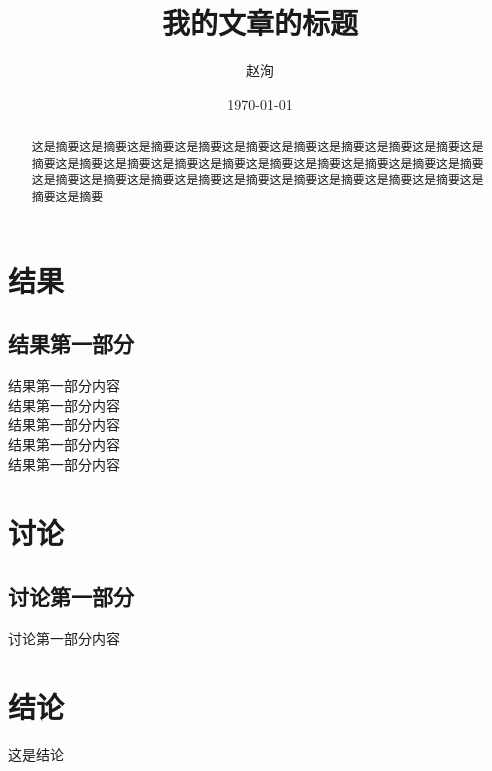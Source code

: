 \documentclass[lang=cn]{elegantpaper}
\title{我的文章的标题}
\author{赵洵}
\institute{组织机构}
\date{\today}
\begin{document}
    \maketitle

    \renewcommand{\abstractname}{摘要}
    \begin{abstract}
        这是摘要这是摘要这是摘要这是摘要这是摘要这是摘要这是摘要这是摘要这是摘要这是摘要这是摘要这是摘要这是摘要这是摘要这是摘要这是摘要这是摘要这是摘要这是摘要这是摘要这是摘要这是摘要这是摘要这是摘要这是摘要这是摘要这是摘要这是摘要这是摘要这是摘要
    \end{abstract}

	\section{结果}
		\subsection{结果第一部分}
            结果第一部分内容\\
            结果第一部分内容\\
            结果第一部分内容\\
            结果第一部分内容\\
            结果第一部分内容
	\section{讨论}
        \subsection{讨论第一部分}
            讨论第一部分内容
	\section{结论}
        这是结论
\end{document}
